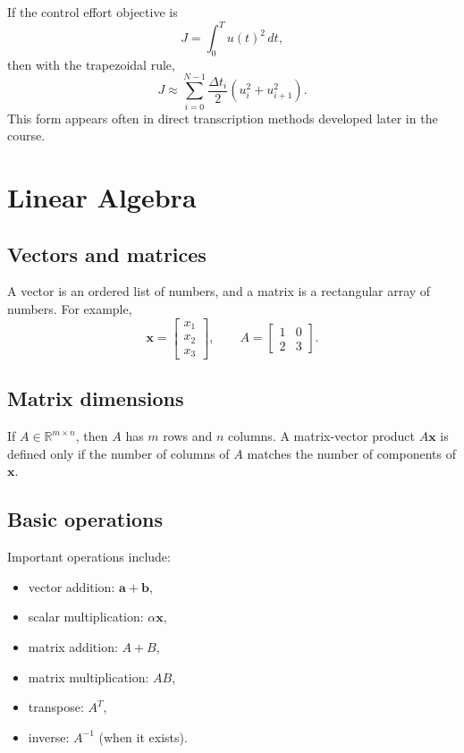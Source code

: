 \documentclass[11pt]{article}
\newcommand{\vect}[1]{\boldsymbol{#1}}
\newcommand{\R}{\mathbb{R}}
\begin{document}
If the control effort objective is
\begin{equation}
J=\int_{0}^{T} u(t)^2\,dt,
\end{equation}
then with the trapezoidal rule,
\begin{equation}
J \approx \sum_{i=0}^{N-1} \frac{\Delta t_i}{2}\left(u_i^2+u_{i+1}^2\right).
\end{equation}
This form appears often in direct transcription methods developed later in the course.

\section{Linear Algebra}

\subsection{Vectors and matrices}

A vector is an ordered list of numbers, and a matrix is a rectangular array of numbers. For example,
\begin{equation}
\vect{x} = \begin{bmatrix} x_1 \\ x_2 \\ x_3 \end{bmatrix},
\qquad
A = \begin{bmatrix}
1 & 0 \\
2 & 3
\end{bmatrix}.
\end{equation}

\subsection{Matrix dimensions}

If $A\in\R^{m\times n}$, then $A$ has $m$ rows and $n$ columns. A matrix-vector product $A\vect{x}$ is defined only if the number of columns of $A$ matches the number of components of $\vect{x}$.

\subsection{Basic operations}

Important operations include:
\begin{itemize}[leftmargin=1.4em]
  \item vector addition: $\vect{a}+\vect{b}$,
  \item scalar multiplication: $\alpha \vect{x}$,
  \item matrix addition: $A+B$,
  \item matrix multiplication: $AB$,
  \item transpose: $A^T$,
  \item inverse: $A^{-1}$ (when it exists).
\end{itemize}
\end{document}
